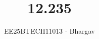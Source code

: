 \documentclass[journal]{IEEEtran}
\begin{document}

\vspace{3cm}

\title{12.235}
\author{EE25BTECH11013 - Bhargav}
\maketitle
    {\let\newpage\relax\maketitle}

\renewcommand{\thefigure}{\theenumi}
\renewcommand{\thetable}{\theenumi}
\setlength{\intextsep}{10pt} %

\renewcommand{\thetable}{\theenumi}
\end{document}
